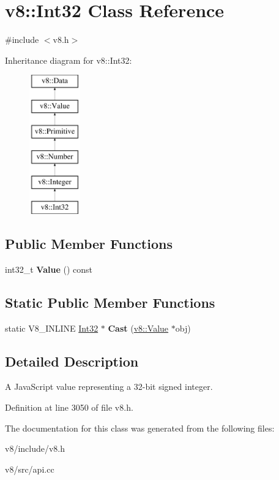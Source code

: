 \hypertarget{classv8_1_1Int32}{}\section{v8\+:\+:Int32 Class Reference}
\label{classv8_1_1Int32}


{\ttfamily \#include $<$v8.\+h$>$}

Inheritance diagram for v8\+:\+:Int32\+:\begin{figure}[H]
\begin{center}
\leavevmode
\includegraphics[height=6.000000cm]{classv8_1_1Int32}
\end{center}
\end{figure}
\subsection*{Public Member Functions}
\begin{DoxyCompactItemize}
\item 
\mbox{\label{classv8_1_1Int32_abc5db5bf900563b174ee8e829d3431c4}} 
int32\+\_\+t {\bfseries Value} () const
\end{DoxyCompactItemize}
\subsection*{Static Public Member Functions}
\begin{DoxyCompactItemize}
\item 
\mbox{\label{classv8_1_1Int32_a910c59c30a7f5f3c96afd0ba10d5339b}} 
static V8\+\_\+\+I\+N\+L\+I\+NE \mbox{\hyperlink{classv8_1_1Int32}{Int32}} $\ast$ {\bfseries Cast} (\mbox{\hyperlink{classv8_1_1Value}{v8\+::\+Value}} $\ast$obj)
\end{DoxyCompactItemize}


\subsection{Detailed Description}
A Java\+Script value representing a 32-\/bit signed integer. 

Definition at line 3050 of file v8.\+h.



The documentation for this class was generated from the following files\+:\begin{DoxyCompactItemize}
\item 
v8/include/v8.\+h\item 
v8/src/api.\+cc\end{DoxyCompactItemize}
